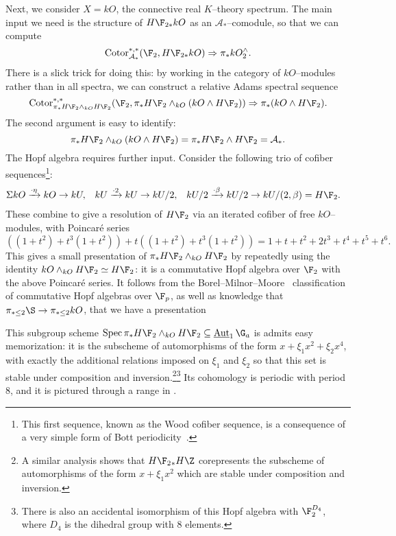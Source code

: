 \begin{example}
Next, we consider $X = kO$, the connective real $K$--theory spectrum.  The main input we need is the structure of $H\F_{2*} kO$ as an $\mathcal A_*$--comodule, so that we can compute \[\Cotor_{\mathcal A_*}^{*, *}(\F_2, H\F_{2*} kO) \Rightarrow \pi_* kO^\wedge_2.\]  There is a slick trick for doing this: by working in the category of $kO$--modules rather than in all spectra, we can construct a relative Adams spectral sequence \[\Cotor_{\pi_* H\F_2 \sm_{kO} H\F_2}^{*, *}(\F_2, \pi_* H\F_2 \sm_{kO}(kO \sm H\F_2)) \Rightarrow \pi_*(kO \sm H\F_2).\]  The second argument is easy to identify: \[\pi_* H\F_2 \sm_{kO}(kO \sm H\F_2) = \pi_* H\F_2 \sm H\F_2 = \mathcal A_*.\]  The Hopf algebra requires further input.  Consider the following trio of cofiber sequences\footnote{This first sequence, known as the Wood cofiber sequence, is a consequence of a very simple form of Bott periodicity~\cite[Section 5]{Harris}.}:
\begin{align*}
\Susp kO & \xrightarrow{\cdot \eta} kO \to kU, &
kU & \xrightarrow{\cdot 2} kU \to kU / 2, &
kU / 2 & \xrightarrow{\cdot \beta} kU / 2 \to kU / (2, \beta) = H\F_2.
\end{align*}
These combine to give a resolution of $H\F_2$ via an iterated cofiber of free $kO$--modules, with Poincar\'e series \[((1 + t^2) + t^3(1 + t^2)) + t((1 + t^2) + t^3(1 + t^2)) = 1 + t + t^2 + 2t^3 + t^4 + t^5 + t^6.\]  This gives a small presentation of $\pi_* H\F_2 \sm_{kO} H\F_2$ by repeatedly using the identity $kO \sm_{kO} H\F_2 \simeq H\F_2$: it is a commutative Hopf algebra over $\F_2$ with the above Poincar\'e series.  It follows from the Borel--Milnor--Moore~\cite[Theorem 7.11]{MilnorMoore} classification of commutative Hopf algebras over $\F_p$, as well as knowledge that $\pi_{* \le 2} \S \to \pi_{* \le 2} kO$, that we have a presentation
\begin{center}
\end{center}
This subgroup scheme $\Spec \pi_* H\F_2 \sm_{kO} H\F_2 \subseteq \InternalAut_1 \G_a$ is admits easy memorization: it is the subscheme of automorphisms of the form $x + \xi_1 x^2 + \xi_2 x^4$, with exactly the additional relations imposed on $\xi_1$ and $\xi_2$ so that this set is stable under composition and inversion.\footnote{A similar analysis shows that $H\F_2{}_* H\Z$ corepresents the subscheme of automorphisms of the form $x + \xi_1 x^2$ which are stable under composition and inversion.}\footnote{There is also an accidental isomorphism of this Hopf algebra with $\F_2^{D_4}$, where $D_4$ is the dihedral group with $8$ elements.}  Its cohomology is periodic with period $8$, and it is pictured through a range in .

\end{example}
